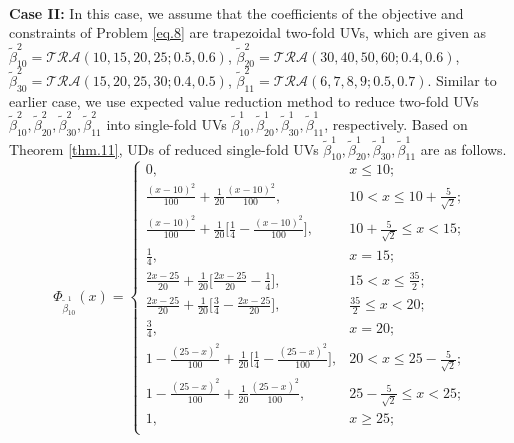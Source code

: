 \\
\textbf{Case II:} In this case, we assume that the coefficients of the objective and constraints of Problem \ref{eq.8} are trapezoidal two-fold UVs, which are given as $\tilde{\beta}_{10}^2=\mathcal{TRA}(10,15,20,25;0.5,0.6)$, $\tilde{\beta}_{20}^2=\mathcal{TRA}(30,40,50,60;0.4,0.6)$, $\tilde{\beta}_{30}^2=\mathcal{TRA}(15,20,25,30;0.4,0.5)$, $\tilde{\beta}_{11}^2=\mathcal{TRA}(6,7,8,9;0.5,0.7)$. Similar to earlier case, we use expected value reduction method to reduce two-fold UVs $\tilde{\beta}_{10}^2,\tilde{\beta}_{20}^2,\tilde{\beta}_{30}^2,\tilde{\beta}_{11}^2$ into single-fold UVs $\tilde{\beta}_{10}^1,\tilde{\beta}_{20}^1,\tilde{\beta}_{30}^1,\tilde{\beta}_{11}^1$, respectively. Based on Theorem \ref{thm.11}, UDs of reduced single-fold UVs $\tilde{\beta}_{10}^1,\tilde{\beta}_{20}^1,\tilde{\beta}_{30}^1,\tilde{\beta}_{11}^1$ are as follows. 
\[\Phi_{\tilde{\beta}_{10}^1}(x)=\left\{
\begin{array}{ll}
	0, & x\leq 10;\\
	\frac{(x-10)^2}{100}+\frac{1}{20}\frac{(x-10)^2}{100}, & 10<x\leq 10+\frac{5}{\sqrt{2}};\\
	\frac{(x-10)^2}{100}+\frac{1}{20}\big[\frac{1}{4}-\frac{(x-10)^2}{100}\big], & 10+\frac{5}{\sqrt{2}}\leq x<15;\\
	\frac{1}{4}, & x=15;\\
	\frac{2x-25}{20}+\frac{1}{20}\big[\frac{2x-25}{20}-\frac{1}{4}\big], & 15< x\leq \frac{35}{2};\\
	\frac{2x-25}{20}+\frac{1}{20}\big[\frac{3}{4}-\frac{2x-25}{20}\big], & \frac{35}{2}\leq x<20;\\
	\frac{3}{4}, & x=20;\\
	1-\frac{(25-x)^2}{100}+\frac{1}{20}\big[\frac{1}{4}-\frac{(25-x)^2}{100}\big], & 20<x\leq 25-\frac{5}{\sqrt{2}};\\
	1-\frac{(25-x)^2}{100}+\frac{1}{20}\frac{(25-x)^2}{100}, &  25-\frac{5}{\sqrt{2}}\leq x<25;\\
	1, & x\geq 25;\\
\end{array}
\right.
\]


